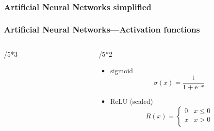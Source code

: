 \documentclass[
  aspectratio=1610, %
  intlimits %
]{beamer}
\begin{document}
 \begin{frame}
 \frametitle{Artificial Neural Networks simplified}
 \begin{center}
  \tikzANN{}
\end{center}

\end{frame}

\begin{frame}
 \frametitle{Artificial Neural Networks---Activation functions}
 \begin{columns}
  \begin{column}{\linewidth/5*3}
  \end{column}
  \begin{column}{\linewidth/5*2}
   \begin{itemize}
    \item sigmoid
     \[
      \sigma(x) = \frac{1}{1+\mathrm{e}^{-x}}
     \]
    \item<2> ReLU (scaled)
     \[
      R(x) = \begin{cases}
       0 & x \leq 0 \\
       x & x > 0\\
      \end{cases}
     \]
   \end{itemize}
  \end{column}
 \end{columns}
\end{frame}


\end{document}
